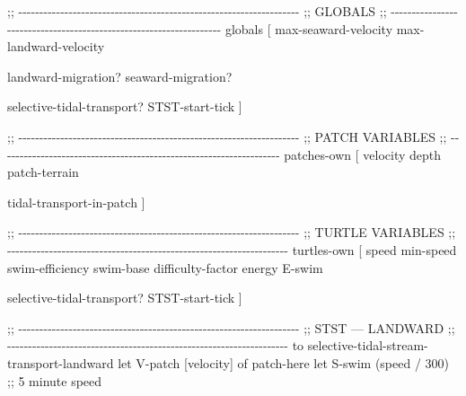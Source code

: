 \documentclass[
]{book}
\newenvironment{Shaded}{\begin{snugshade}}{\end{snugshade}}
\newcommand{\NormalTok}[1]{#1}
\begin{document}
\begin{Shaded}
\begin{Highlighting}[]
\NormalTok{;; {-}{-}{-}{-}{-}{-}{-}{-}{-}{-}{-}{-}{-}{-}{-}{-}{-}{-}{-}{-}{-}{-}{-}{-}{-}{-}{-}{-}{-}{-}{-}{-}{-}{-}{-}{-}{-}{-}{-}{-}{-}{-}{-}{-}{-}{-}{-}{-}{-}{-}{-}{-}{-}{-}{-}{-}{-}{-}{-}{-}{-}{-}{-}{-}{-}{-}{-}}
\NormalTok{;;  GLOBALS}
\NormalTok{;; {-}{-}{-}{-}{-}{-}{-}{-}{-}{-}{-}{-}{-}{-}{-}{-}{-}{-}{-}{-}{-}{-}{-}{-}{-}{-}{-}{-}{-}{-}{-}{-}{-}{-}{-}{-}{-}{-}{-}{-}{-}{-}{-}{-}{-}{-}{-}{-}{-}{-}{-}{-}{-}{-}{-}{-}{-}{-}{-}{-}{-}{-}{-}{-}{-}{-}{-}}
\NormalTok{globals [}
\NormalTok{  max{-}seaward{-}velocity}
\NormalTok{  max{-}landward{-}velocity}
  
\NormalTok{  landward{-}migration?}
\NormalTok{  seaward{-}migration?}

\NormalTok{  selective{-}tidal{-}transport?}
\NormalTok{  STST{-}start{-}tick}
\NormalTok{]}

\NormalTok{;; {-}{-}{-}{-}{-}{-}{-}{-}{-}{-}{-}{-}{-}{-}{-}{-}{-}{-}{-}{-}{-}{-}{-}{-}{-}{-}{-}{-}{-}{-}{-}{-}{-}{-}{-}{-}{-}{-}{-}{-}{-}{-}{-}{-}{-}{-}{-}{-}{-}{-}{-}{-}{-}{-}{-}{-}{-}{-}{-}{-}{-}{-}{-}{-}{-}{-}{-}}
\NormalTok{;;  PATCH VARIABLES}
\NormalTok{;; {-}{-}{-}{-}{-}{-}{-}{-}{-}{-}{-}{-}{-}{-}{-}{-}{-}{-}{-}{-}{-}{-}{-}{-}{-}{-}{-}{-}{-}{-}{-}{-}{-}{-}{-}{-}{-}{-}{-}{-}{-}{-}{-}{-}{-}{-}{-}{-}{-}{-}{-}{-}{-}{-}{-}{-}{-}{-}{-}{-}{-}{-}{-}{-}{-}{-}{-}}
\NormalTok{patches{-}own [}
\NormalTok{  velocity}
\NormalTok{  depth}
\NormalTok{  patch{-}terrain}
  
\NormalTok{  tidal{-}transport{-}in{-}patch}
\NormalTok{]}

\NormalTok{;; {-}{-}{-}{-}{-}{-}{-}{-}{-}{-}{-}{-}{-}{-}{-}{-}{-}{-}{-}{-}{-}{-}{-}{-}{-}{-}{-}{-}{-}{-}{-}{-}{-}{-}{-}{-}{-}{-}{-}{-}{-}{-}{-}{-}{-}{-}{-}{-}{-}{-}{-}{-}{-}{-}{-}{-}{-}{-}{-}{-}{-}{-}{-}{-}{-}{-}{-}}
\NormalTok{;;  TURTLE VARIABLES}
\NormalTok{;; {-}{-}{-}{-}{-}{-}{-}{-}{-}{-}{-}{-}{-}{-}{-}{-}{-}{-}{-}{-}{-}{-}{-}{-}{-}{-}{-}{-}{-}{-}{-}{-}{-}{-}{-}{-}{-}{-}{-}{-}{-}{-}{-}{-}{-}{-}{-}{-}{-}{-}{-}{-}{-}{-}{-}{-}{-}{-}{-}{-}{-}{-}{-}{-}{-}{-}{-}}
\NormalTok{turtles{-}own [}
\NormalTok{  speed}
\NormalTok{  min{-}speed}
\NormalTok{  swim{-}efficiency}
\NormalTok{  swim{-}base}
\NormalTok{  difficulty{-}factor}
\NormalTok{  energy}
\NormalTok{  E{-}swim}
  
\NormalTok{  selective{-}tidal{-}transport?}
\NormalTok{  STST{-}start{-}tick}
\NormalTok{]}

\NormalTok{;; {-}{-}{-}{-}{-}{-}{-}{-}{-}{-}{-}{-}{-}{-}{-}{-}{-}{-}{-}{-}{-}{-}{-}{-}{-}{-}{-}{-}{-}{-}{-}{-}{-}{-}{-}{-}{-}{-}{-}{-}{-}{-}{-}{-}{-}{-}{-}{-}{-}{-}{-}{-}{-}{-}{-}{-}{-}{-}{-}{-}{-}{-}{-}{-}{-}{-}{-}}
\NormalTok{;;  STST — LANDWARD}
\NormalTok{;; {-}{-}{-}{-}{-}{-}{-}{-}{-}{-}{-}{-}{-}{-}{-}{-}{-}{-}{-}{-}{-}{-}{-}{-}{-}{-}{-}{-}{-}{-}{-}{-}{-}{-}{-}{-}{-}{-}{-}{-}{-}{-}{-}{-}{-}{-}{-}{-}{-}{-}{-}{-}{-}{-}{-}{-}{-}{-}{-}{-}{-}{-}{-}{-}{-}{-}{-}}
\NormalTok{to selective{-}tidal{-}stream{-}transport{-}landward}
\NormalTok{  let V{-}patch [velocity] of patch{-}here}
\NormalTok{  let S{-}swim (speed / 300) ;; 5 minute speed}


\end{Highlighting}
\end{Shaded}
\end{document}
